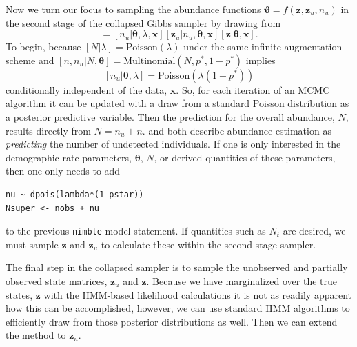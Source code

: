 \documentclass[12pt]{article}
\newcommand{\bx}{\ensuremath{\mathbf{x}}}
\newcommand{\bz}{\ensuremath{\mathbf{z}}}
\newcommand{\bt}{\ensuremath{\boldsymbol{\theta}}}
\newcommand{\bvt}{\ensuremath{\boldsymbol{\vartheta}}}
\begin{document}
Now we turn our focus to sampling the abundance functions $\bvt = f(\bz,\bz_u,n_u)$ in the second stage of the collapsed Gibbs sampler by drawing from 
\begin{equation}
[\bz, \bz_u, n_u|\bt,\lambda,\bx] = [n_u|\bt,\lambda,\bx][\bz_u|n_u,\bt,\bx][\bz|\bt,\bx].
\end{equation} 
To begin, because $[N|\lambda] = \text{Poisson}(\lambda)$ under the same infinite augmentation scheme and $[n,n_u|N,\bt] = \text{Multinomial}(N, p^*, 1-p^*)$ implies 
\[
[n_u|\bt, \lambda] = \text{Poisson}(\lambda (1-p^*))
\]
conditionally independent of the data, $\bx$. So, for each iteration of an MCMC algorithm it can be updated with a draw from a standard Poisson distribution as a posterior predictive variable. Then the prediction for the overall abundance, $N$, results directly from $N = n_u + n$. \cite{schofield2023estimating} and \cite{johnson2010model} both describe abundance estimation as {\it predicting} the number of undetected individuals. If one is only interested in the demographic rate parameters, $\bt$, $N$, or derived quantities of these parameters, then one only needs to add 
\begin{verbatim}
nu ~ dpois(lambda*(1-pstar))
Nsuper <- nobs + nu
\end{verbatim}
to the previous \verb|nimble| model statement. If quantities such as $N_t$ are desired, we must sample $\bz$ and $\bz_u$ to calculate these within the second stage sampler. 

The final step in the collapsed sampler is to sample the unobserved and partially observed state matrices, $\bz_u$ and $\bz$. Because we have marginalized over the true states, $\bz$ with the HMM-based likelihood calculations it is not as readily apparent how this can be accomplished, however, we can use standard HMM algorithms to efficiently draw from those posterior distributions as well. Then we can extend the method to $\bz_u$.
\end{document}
